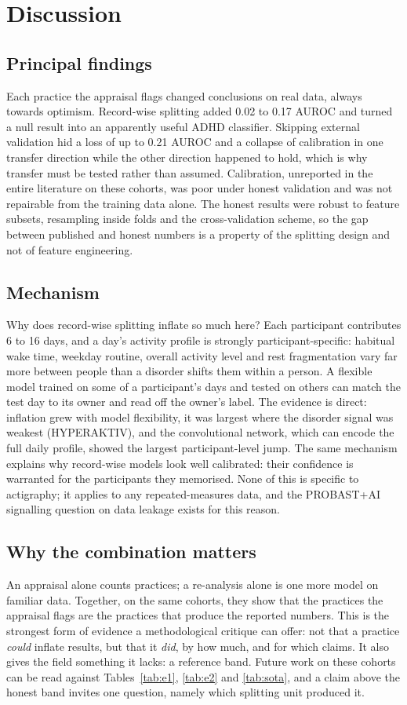 \documentclass[11pt,a4paper]{article}
\begin{document}
\section{Discussion}
\subsection{Principal findings}
Each practice the appraisal flags changed conclusions on real data, always towards optimism.
Record-wise splitting added 0.02 to 0.17 AUROC and turned a null result into an apparently useful
ADHD classifier. Skipping external validation hid a loss of up to 0.21 AUROC and a collapse of
calibration in one transfer direction while the other direction happened to hold, which is why
transfer must be tested rather than assumed. Calibration, unreported in the entire literature on
these cohorts, was poor under honest validation and was not repairable from the training data
alone. The honest results were robust to feature subsets, resampling inside folds and the
cross-validation scheme, so the gap between published and honest numbers is a property of the
splitting design and not of feature engineering.

\subsection{Mechanism}
Why does record-wise splitting inflate so much here? Each participant contributes 6 to 16 days,
and a day's activity profile is strongly participant-specific: habitual wake time, weekday
routine, overall activity level and rest fragmentation vary far more between people than a
disorder shifts them within a person. A flexible model trained on some of a participant's days
and tested on others can match the test day to its owner and read off the owner's label. The
evidence is direct: inflation grew with model flexibility, it was largest where the disorder
signal was weakest (HYPERAKTIV), and the convolutional network, which can encode the full daily
profile, showed the largest participant-level jump. The same mechanism explains why record-wise
models look well calibrated: their confidence is warranted for the participants they memorised.
None of this is specific to actigraphy; it applies to any repeated-measures data, and the
PROBAST+AI signalling question on data leakage exists for this reason.

\subsection{Why the combination matters}
An appraisal alone counts practices; a re-analysis alone is one more model on familiar data.
Together, on the same cohorts, they show that the practices the appraisal flags are the practices
that produce the reported numbers. This is the strongest form of evidence a methodological
critique can offer: not that a practice \emph{could} inflate results, but that it \emph{did}, by
how much, and for which claims. It also gives the field something it lacks: a reference band.
Future work on these cohorts can be read against Tables~\ref{tab:e1}, \ref{tab:e2} and
\ref{tab:sota}, and a claim above the honest band invites one question, namely which splitting
unit produced it.
\end{document}
